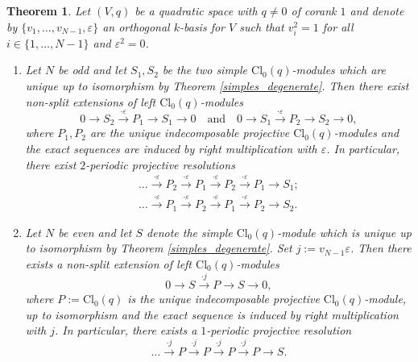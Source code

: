 \documentclass[10pt,a4paper]{amsart}
\newtheorem{theorem}{Theorem}
\newcommand{\evencl}{\mathrm{Cl}_0}
\begin{document}
\begin{theorem}\label{extensions_and_res}
    Let $(V,q)$ be a quadratic space with $q\neq 0$ of corank $1$ and denote by $\{v_1, \dots, v_{N-1}, \varepsilon\}$ an orthogonal $k$-basis for $V$ such that $v_i^2=1$ for all $i \in \{1,\dots, N-1\}$ and $\varepsilon^2 =0$.
    \begin{enumerate}[label=\roman*)]
        \item Let $N$ be odd and let $S_1,S_2$ be the two simple $\evencl(q)$-modules which are unique up to isomorphism by Theorem \ref{simples_degenerate}. Then there exist non-split extensions of left $\evencl(q)$-modules
        \begin{equation}\label{extensions_comp}
            0 \longrightarrow S_2 \overset{\cdot\varepsilon}{\longrightarrow} P_1 \longrightarrow S_1 \longrightarrow 0
            \quad \text{and} \quad 
            0 \longrightarrow S_1 \overset{\cdot\varepsilon}{\longrightarrow} P_2 \longrightarrow S_2 \longrightarrow 0,
        \end{equation}
        where $P_1,P_2$ are the unique indecomposable projective $\evencl(q)$-modules and the exact sequences are induced by right multiplication with $\varepsilon$. In particular, there exist $2$-periodic projective resolutions 
        \begin{equation}\label{projective_resolutions}
        \begin{aligned}
            \dots \overset{\cdot\varepsilon}{\longrightarrow} P_2 \overset{\cdot\varepsilon}{\longrightarrow} P_1 \overset{\cdot\varepsilon}{\longrightarrow}P_2 \overset{\cdot\varepsilon}{\longrightarrow} P_1 \longrightarrow S_1;\\
            \dots \overset{\cdot\varepsilon}{\longrightarrow} P_1\overset{\cdot\varepsilon}{\longrightarrow} P_2 \overset{\cdot\varepsilon}{\longrightarrow} P_1 \overset{\cdot\varepsilon}{\longrightarrow} P_2 \longrightarrow S_2.
        \end{aligned}
        \end{equation} 
        \item Let $N$ be even and let $S$ denote the simple $\evencl(q)$-module which is unique up to isomorphism by Theorem \ref{simples_degenerate}. Set $j := v_{N-1}\varepsilon$.
        Then there exists a non-split extension of left $\evencl(q)$-modules 
        \begin{equation}
            0 \longrightarrow S \overset{\cdot j}{\longrightarrow} P \longrightarrow S\longrightarrow 0,
        \end{equation}
        where $P := \evencl(q)$ is the unique indecomposable projective $\evencl(q)$-module, up to isomorphism and the exact sequence is induced by right multiplication with $j$. In particular, there exists a $1$-periodic projective resolution
        \begin{equation}\label{even_proj_res}
            \dots \overset{\cdot j}{\longrightarrow} P \overset{\cdot j}{\longrightarrow} P \overset{\cdot j}{\longrightarrow} P \overset{\cdot j}{\longrightarrow} P \longrightarrow S.
        \end{equation}
        \end{enumerate}
\end{theorem}
\end{document}
